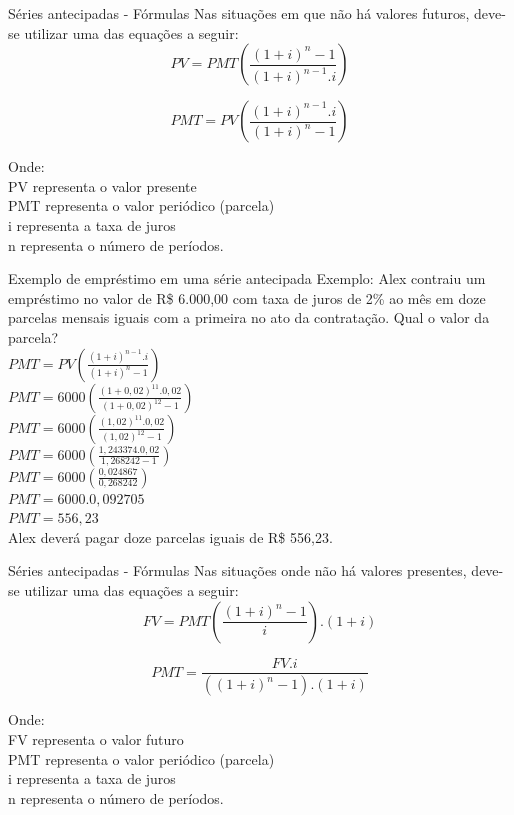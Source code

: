 \documentclass[10pt]{beamer}
\begin{document}
\begin{frame}{Séries antecipadas - Fórmulas}
Nas situações em que não há valores futuros, deve-se utilizar uma das equações a seguir:
  \begin{equation*}
    PV = PMT \left( \frac{ ( 1 + i ) ^{n} - 1 }{ ( 1 + i ) ^{n-1} . i } \right) 
  \end{equation*}

  \begin{equation*}
    PMT = PV \left( \frac{ ( 1 + i ) ^{n-1} .i }{ ( 1 + i ) ^{n} - 1 } \right) 
  \end{equation*}

\tiny Onde: \\   PV representa o valor presente \\ PMT representa o valor periódico (parcela) \\ i representa a taxa de juros \\ n representa o número de períodos.
\end{frame}


\begin{frame}{Exemplo de empréstimo em uma série antecipada}
\footnotesize  Exemplo: Alex contraiu um empréstimo no valor de R\$ 6.000,00 com taxa de juros de 2\% ao mês em doze parcelas mensais iguais com a primeira no ato da contratação. Qual o valor da parcela?\\
$ PMT = PV \left( \frac{ ( 1 + i ) ^{n-1} .i }{ ( 1 + i ) ^{n} - 1 } \right)  $\\
$ PMT = 6000 \left( \frac{ ( 1 + 0,02 ) ^{11} .0,02 }{ ( 1 + 0,02 ) ^{12} - 1 } \right)  $\\
$ PMT = 6000 \left( \frac{ ( 1,02 ) ^{11} .0,02 }{ ( 1,02 ) ^{12} - 1 } \right)  $\\
$ PMT = 6000 \left( \frac{ 1,243374 .0,02 }{ 1,268242 - 1 } \right)  $\\
$ PMT = 6000 \left( \frac{ 0,024867 }{ 0,268242 } \right)  $\\
$ PMT = 6000 . 0,092705  $\\
$ PMT = 556,23  $\\
Alex deverá pagar doze parcelas iguais de R\$ 556,23.
\end{frame}


\begin{frame}{Séries antecipadas - Fórmulas}
Nas situações onde não há valores presentes, deve-se utilizar uma das equações a seguir:
  \begin{equation*}
    FV = PMT \left( \frac{ ( 1 + i ) ^{n} - 1 }{ i } \right) . ( 1 + i )
  \end{equation*}

  \begin{equation*}
    PMT =  \frac{ FV.i }{( ( 1 + i ) ^{n} - 1 ). ( 1 + i ) } 
  \end{equation*}

\tiny Onde: \\   FV representa o valor futuro \\ PMT representa o valor periódico (parcela) \\ i representa a taxa de juros \\ n representa o número de períodos.
\end{frame}
\end{document}
